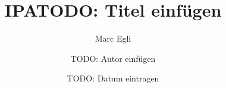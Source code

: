 \documentclass[12pt]{report}
\author{Marc Egli}
\title{IPA}
\title{TODO: Titel einfügen}
\author{TODO: Autor einfügen}
\date{TODO: Datum eintragen}
\begin{document}
{
  \raggedright
  \setlength{\parskip}{\baselineskip}
  
  
  
}
{
  \makeatletter


  \renewcommand\listoftables{%
      \section{\listtablename}%
      \@mkboth{\MakeUppercase\listtablename}%
              {\MakeUppercase\listtablename}%
      \@starttoc{lot}%
  }

  \renewcommand\listoffigures{%
      \section{\listfigurename}%
      \@mkboth{\MakeUppercase\listfigurename}%
          {\MakeUppercase\listfigurename}%
      \@starttoc{lof}%
  }

  \renewcommand\lstlistoflistings{%
      \section{Code Verzeichnis}%
      \@mkboth{Code Verzeichnis}%
          {Code Verzeichnis}%
      \@starttoc{lol}%
  }
  \makeatother
  
  

}
\end{document}
